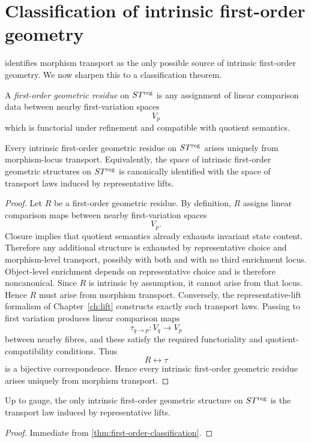 \section{Classification of intrinsic first-order geometry}
\label{sec:first-order-classification}
 identifies morphism transport as the only
possible source of intrinsic first-order geometry.  We now sharpen this
to a classification theorem.
\begin{definition}
	A \emph{first-order geometric residue} on \(ST^{\mathrm{reg}}\) is any
	assignment of linear comparison data between nearby first-variation
	spaces
	\[
		V_p
	\]
	which is functorial under refinement and compatible with quotient
	semantics.
\end{definition}
\begin{theorem}
	\label{thm:first-order-classification}
	Every intrinsic first-order geometric residue on \(ST^{\mathrm{reg}}\) arises
	uniquely from morphism-locus transport.
	Equivalently, the space of intrinsic first-order geometric structures on
	\(ST^{\mathrm{reg}}\) is canonically identified with the space of transport laws
	induced by representative lifts.
\end{theorem}
\begin{proof}
	Let \(R\) be a first-order geometric residue.  By definition, \(R\)
	assigns linear comparison maps between nearby first-variation spaces
	\[
		V_p.
	\]
	Closure implies that quotient semantics already exhausts invariant
	state content.
	Therefore any additional structure is exhausted by representative
	choice and morphism-level transport, possibly with both and with no
	third enrichment locus.
	Object-level enrichment depends on representative choice and is
	therefore noncanonical.
	Since \(R\) is intrinsic by assumption, it cannot arise from that
	locus.
	Hence \(R\) must arise from morphism transport.
	Conversely, the representative-lift formalism of
	Chapter~\ref{ch:lift} constructs exactly such transport laws.  Passing
	to first variation produces linear comparison maps
	\[
		\tau_{q\to p}:V_q\to V_p
	\]
	between nearby fibres, and these satisfy the required functoriality and
	quotient-compatibility conditions.
	Thus
	\[
		R\longleftrightarrow \tau
	\]
	is a bijective correspondence.  Hence every intrinsic first-order
	geometric residue arises uniquely from morphism transport.
\end{proof}
\begin{corollary}
	Up to gauge, the only intrinsic first-order geometric structure on
	\(ST^{\mathrm{reg}}\) is the transport law induced by representative lifts.
\end{corollary}
\begin{proof}
	Immediate from \cref{thm:first-order-classification}.
\end{proof}
